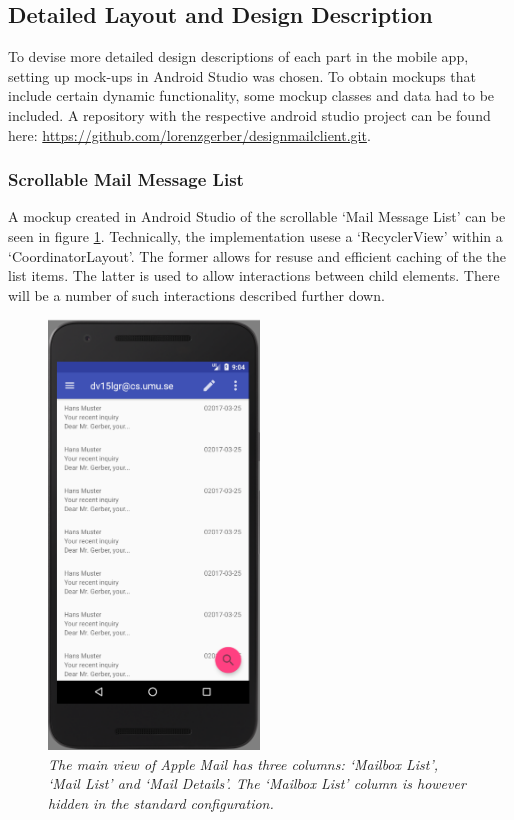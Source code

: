 \documentclass[a4paper,11pt,twoside]{article}
\begin{document}
\subsection{Detailed Layout and Design Description}
To devise more detailed design descriptions of each part in the mobile app,
setting up mock-ups in Android Studio was chosen. To obtain mockups that
include certain dynamic functionality, some mockup classes and data had to be
included. A repository with the respective android studio project can be found
here: \url{https://github.com/lorenzgerber/designmailclient.git}.

\subsubsection{Scrollable Mail Message List}
A mockup created in Android Studio of the scrollable `Mail Message List' can be
seen in figure \ref{fig:mail_message_list}. Technically, the implementation
usese a `RecyclerView' within a `CoordinatorLayout'. The former allows for
resuse and efficient caching of the the list items. The latter is used to allow
interactions between child elements. There will be a number of such interactions
described further down.

\begin{figure}[hp!]

  \centering
    \includegraphics[width=0.5\textwidth]{mail_message_list}
    \caption{\textit{The main view of Apple Mail has three columns: `Mailbox List',
    `Mail List' and `Mail Details'. The `Mailbox List' column is however
    hidden in the standard configuration.}}
    \label{fig:mail_message_list}
\end{figure}
\end{document}
